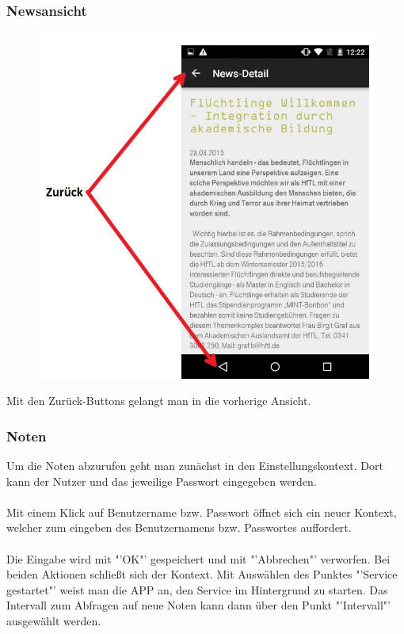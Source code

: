 \newpage
\subsubsection{Newsansicht}
\begin{figure}[H]
	\centering
	\includegraphics[scale=0.6]{03_Bedienungsanleitung/img/news.jpg}
\end{figure}

Mit den Zurück-Buttons gelangt man in die vorherige Ansicht.



\subsubsection{Noten}

Um die Noten abzurufen geht man zunächst in den Einstellungskontext. Dort kann der Nutzer und das jeweilige Passwort eingegeben werden.
\\
\\
Mit einem Klick auf Benutzername bzw. Passwort öffnet sich ein neuer Kontext, welcher zum eingeben des Benutzernamens bzw. Passwortes auffordert.
\\
\\
Die Eingabe wird mit "'OK"' gespeichert und mit "'Abbrechen"' verworfen. Bei beiden Aktionen schließt sich der Kontext.
Mit Auswählen des Punktes "'Service gestartet"' weist man die APP an, den Service im Hintergrund zu starten. Das Intervall zum Abfragen auf neue Noten kann dann über den Punkt "'Intervall"' ausgewählt werden.

